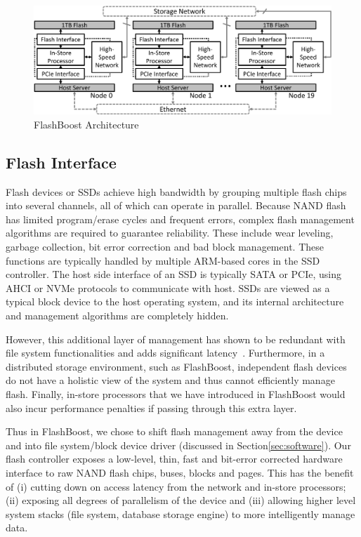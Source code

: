 \begin{figure}[ht]
	\begin{center}
	\includegraphics[width=0.8\paperwidth]{figures/architecture.pdf}
	\caption{FlashBoost Architecture}
	\label{fig:architecture}
	\end{center}
\end{figure}

\subsection{Flash Interface}

Flash devices or SSDs achieve high bandwidth by grouping multiple flash chips
into several channels, all of which can operate in parallel. Because NAND flash
has limited program/erase cycles and frequent errors, complex flash management
algorithms are required to guarantee reliability. These include wear leveling,
garbage collection, bit error correction and bad block management. These
functions are typically handled by multiple ARM-based cores in the SSD
controller. The host side interface of an SSD is typically SATA or PCIe, using
AHCI or NVMe protocols to communicate with host. SSDs are viewed
as a typical block device to the host operating system, and its internal
architecture and management algorithms are completely hidden. 

However, this additional layer of management has shown to be redundant with
file system functionalities and adds significant latency~\cite{redo}.
Furthermore, in a distributed storage environment, such as FlashBoost,
independent flash devices do not have a holistic view of the system and thus
cannot efficiently manage flash. Finally, in-store processors that we have
introduced in FlashBoost would also incur performance penalties if passing
through this extra layer. 

Thus in FlashBoost, we chose to shift flash management
away from the device and into file system/block device driver (discussed in
Section\ref{sec:software}). Our flash controller exposes a low-level, thin,
fast and bit-error corrected hardware interface to raw NAND flash chips, buses,
blocks and pages. This has the benefit of (i) cutting down on access latency
from the network and in-store processors; (ii) exposing all degrees of
parallelism of the device and (iii) allowing higher level system stacks (file
system, database storage engine) to more intelligently manage data. 


